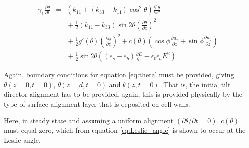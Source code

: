 \begin{eqnarray}
\nonumber \gamma_1\frac{\partial\theta}{\partial t} & = & \left(k_{11}+\left(k_{33}-k_{11}\right)\cos^2\theta\right)\frac{\partial^2\theta}{\partial z^2}\\
\nonumber	& & {} + \frac{1}{2}\left(k_{11}-k_{33}\right)\sin2\theta\left(\frac{\partial\theta}{\partial z}\right)^2\\
\nonumber	& & {} + \frac{1}{2}g'\left(\theta\right)\left(\frac{\partial\phi}{\partial z}\right)^2+c\left(\theta\right)\left(\cos\phi\frac{\partial 							u_x}{\partial z}+\sin\phi\frac{\partial u_y}{\partial z}\right)\\
	& & {} + \frac{1}{2}\sin2\theta\left(\left(e_s-e_b\right)\frac{\partial E}{\partial z}-\epsilon_0\epsilon_aE^2\right)
	\label{eq:theta}
\end{eqnarray}

Again, boundary conditions for equation \ref{eq:theta} must be provided, giving $\theta\left(z=0,t=0\right)$, $\theta\left(z=d,t=0\right)$ and $\theta\left(z,t=0\right)$. That is, the initial tilt director alignment has to be provided, again, this is provided physically by the type of surface alignment layer that is deposited on cell walls.

Here, in steady state and assuming a uniform alignment $\left(\partial\theta / \partial t=0\right)$, $c\left(\theta\right)$ must equal zero, which from equation \ref{eq:Leslie_angle} is shown to occur at the Leslie angle.

%
%
%

